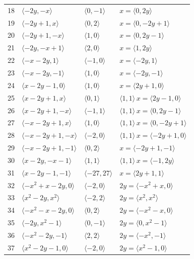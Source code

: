 \documentclass[11pt]{article}
\begin{document}
\begin{longtable}{@{}rlll@{}}
18 & $\langle -2y,-x\rangle$ & $\langle 0,-1\rangle$ & $x=\langle 0,2y\rangle$\\
19 & $\langle -2y+1,x\rangle$ & $\langle 0,2\rangle$ & $x=\langle 0,-2y+1\rangle$\\
20 & $\langle -2y+1,-x\rangle$ & $\langle 1,0\rangle$ & $x=\langle 0,2y-1\rangle$\\
21 & $\langle -2y,-x+1\rangle$ & $\langle 2,0\rangle$ & $x=\langle 1,2y\rangle$\\
22 & $\langle -x-2y,1\rangle$ & $\langle -1,0\rangle$ & $x=\langle -2y,1\rangle$\\
23 & $\langle -x-2y,-1\rangle$ & $\langle 1,0\rangle$ & $x=\langle -2y,-1\rangle$\\
24 & $\langle x-2y-1,0\rangle$ & $\langle 1,0\rangle$ & $x=\langle 2y+1,0\rangle$\\
25 & $\langle x-2y+1,x\rangle$ & $\langle 0,1\rangle$ & $\langle 1,1\rangle\,x=\langle 2y-1,0\rangle$\\
26 & $\langle x-2y+1,-x\rangle$ & $\langle -1,1\rangle$ & $\langle 1,1\rangle\,x=\langle 0,2y-1\rangle$\\
27 & $\langle -x-2y+1,x\rangle$ & $\langle 1,0\rangle$ & $\langle 1,1\rangle\,x=\langle 0,-2y+1\rangle$\\
28 & $\langle -x-2y+1,-x\rangle$ & $\langle -2,0\rangle$ & $\langle 1,1\rangle\,x=\langle -2y+1,0\rangle$\\
29 & $\langle -x-2y+1,-1\rangle$ & $\langle 0,2\rangle$ & $x=\langle -2y+1,-1\rangle$\\
30 & $\langle x-2y,-x-1\rangle$ & $\langle 1,1\rangle$ & $\langle 1,1\rangle\,x=\langle -1,2y\rangle$\\
31 & $\langle x-2y-1,-1\rangle$ & $\langle -27,27\rangle$ & $x=\langle 2y+1,1\rangle$\\
32 & $\langle -x^{2}+x-2y,0\rangle$ & $\langle -2,0\rangle$ & $2y=\langle -x^{2}+x,0\rangle$\\
33 & $\langle x^{2}-2y,x^{2}\rangle$ & $\langle -2,2\rangle$ & $2y=\langle x^{2},x^{2}\rangle$\\
34 & $\langle -x^{2}-x-2y,0\rangle$ & $\langle 0,2\rangle$ & $2y=\langle -x^{2}-x,0\rangle$\\
35 & $\langle -2y,x^{2}-1\rangle$ & $\langle 0,-1\rangle$ & $2y=\langle 0,x^{2}-1\rangle$\\
36 & $\langle -x^{2}-2y,-1\rangle$ & $\langle 2,2\rangle$ & $2y=\langle -x^{2},-1\rangle$\\
37 & $\langle x^{2}-2y-1,0\rangle$ & $\langle -2,0\rangle$ & $2y=\langle x^{2}-1,0\rangle$\\

\end{longtable}
\end{document}
